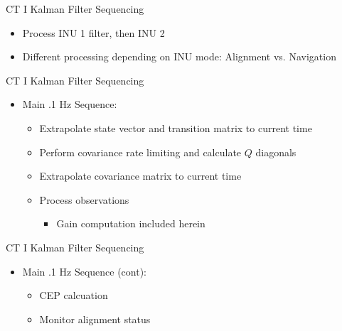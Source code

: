 \begin{frame}
CT I Kalman Filter Sequencing
 \begin{itemize}
 \item Process INU 1 filter, then INU 2
 \item Different processing depending on INU mode: Alignment vs. Navigation
\end{itemize}
\end{frame}

\begin{frame}
CT I Kalman Filter Sequencing
\begin{itemize}
 \item Main .1 Hz Sequence:
	\begin{itemize}
		\item Extrapolate state vector and transition matrix to current time
		\item Perform covariance rate limiting and calculate $Q$ diagonals
		\item Extrapolate covariance matrix to current time
		\item Process observations
		\begin{itemize}
			\item Gain computation included herein
		\end{itemize}
	\end{itemize}
\end{itemize} 
\end{frame}

\begin{frame}
CT I Kalman Filter Sequencing
\begin{itemize}
 \item Main .1 Hz Sequence (cont):
	\begin{itemize}
		\item CEP calcuation 
		\item Monitor alignment status
	\end{itemize}
\end{itemize} 
\end{frame}

